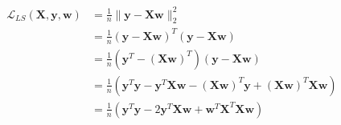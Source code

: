 \newcommand{\matrix}[1]{\mathbf{#1}}
\newcommand{\vector}[1]{\mathbf{#1}}
\newcommand{\X}{\matrix{X}}
\newcommand{\y}{\vector{y}}
\newcommand{\w}{\vector{w}}
\begin{align*}
\mathcal{L}_{LS}(\X,\y,\w) &= \frac{1}{n} \|\y - \X\w\|_2^2 \\
&= \frac{1}{n} (\y - \X\w)^T (\y - \X\w) \\
&= \frac{1}{n} (\y^T - (\X\w)^T) (\y - \X\w) \\
&= \frac{1}{n} \left( \y^T\y - \y^T\X\w - (\X\w)^T\y + (\X\w)^T\X\w \right) \\
&= \frac{1}{n} \left( \y^T\y - 2\y^T\X\w + \w^T\X^T\X\w \right) \\
\end{align*}
